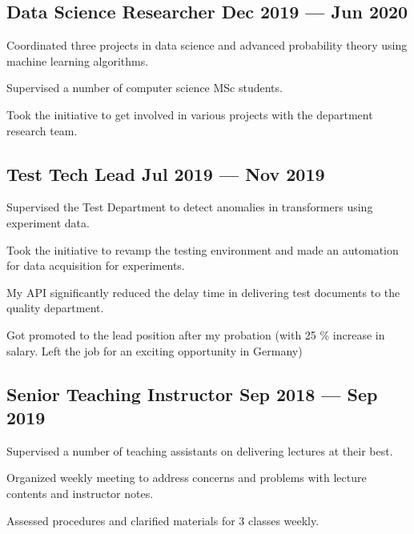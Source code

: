 \documentclass[letter,11pt]{article}
\begin{document}
\subsection{{Data Science Researcher \hfill Dec 2019 --- Jun 2020}}
\begin{zitemize}
	\item Coordinated three projects in data science and advanced probability theory using machine learning algorithms.
	\item Supervised a number of computer science MSc students.
	\item Took the initiative to get involved in various projects with the department research team.
\end{zitemize}

\subsection{{Test Tech Lead \hfill Jul 2019 --- Nov 2019}}
\begin{zitemize}
	\item Supervised the Test Department to detect anomalies in transformers using experiment data.
	\item Took the initiative to revamp the testing environment and made an automation for data acquisition for experiments.
	\item My API significantly reduced the delay time in delivering test documents to the quality department.
	\item Got promoted to the lead position after my probation (with 25 \% increase in salary. Left the job for an exciting opportunity in Germany)
\end{zitemize}

\subsection{Senior Teaching Instructor \hfill Sep 2018 --- Sep 2019}
\begin{zitemize}
	\item Supervised a number of teaching assistants on delivering lectures at their best.
	\item Organized weekly meeting to address concerns and problems with lecture contents and instructor notes.
	\item Assessed procedures and clarified materials for 3 classes weekly.
\end{zitemize}
\end{document}
